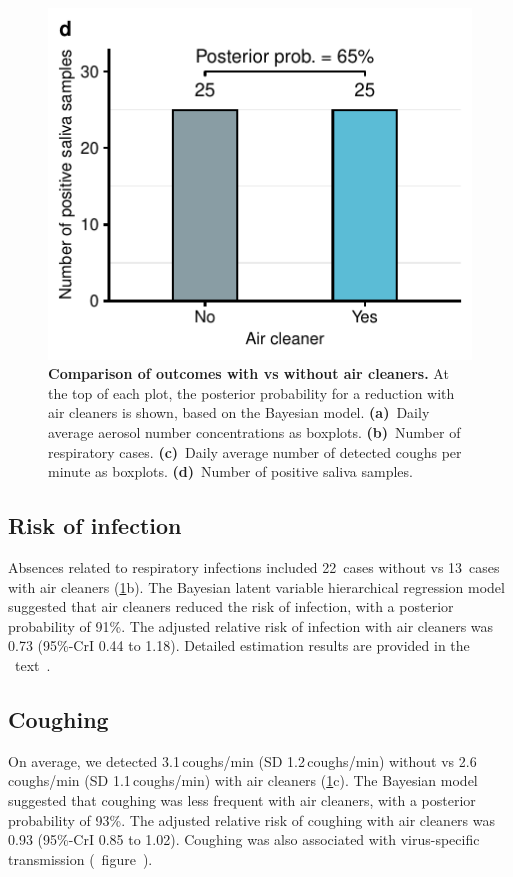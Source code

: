 \documentclass[fleqn,11pt]{wlscirep}
\begin{document}
\begin{figure}[!htpb]
    \includegraphics{../../results/mol-data/saliva-by-study-condition.pdf}
    \caption{\textbf{Comparison of outcomes with vs without air cleaners.} At the top of each plot, the posterior probability for a reduction with air cleaners is shown, based on the Bayesian model. \textbf{(a)}~Daily average aerosol number concentrations as boxplots. \textbf{(b)}~Number of respiratory cases. \textbf{(c)}~Daily average number of detected coughs per minute as boxplots. \textbf{(d)}~Number of positive saliva samples.}
    \label{fig:infection-risk}
\end{figure}

\subsection*{Risk of infection}

Absences related to respiratory infections included 22~cases without vs 13~cases with air cleaners (\cref{fig:infection-risk}b). The Bayesian latent variable hierarchical regression model suggested that air cleaners reduced the risk of infection, with a posterior probability of 91\%. The adjusted relative risk of infection with air cleaners was 0.73 (95\%-CrI 0.44 to 1.18). Detailed estimation results are provided in the \supp~text~. 

\subsection*{Coughing}

On average, we detected 3.1\,coughs/min (SD 1.2\,coughs/min) without vs 2.6\,coughs/min (SD 1.1\,coughs/min) with air cleaners (\cref{fig:infection-risk}c). The Bayesian model suggested that coughing was less frequent with air cleaners, with a posterior probability of 93\%. The adjusted relative risk of coughing with air cleaners was 0.93 (95\%-CrI 0.85 to 1.02). Coughing was also associated with virus-specific transmission (\supp~figure~).
\end{document}

